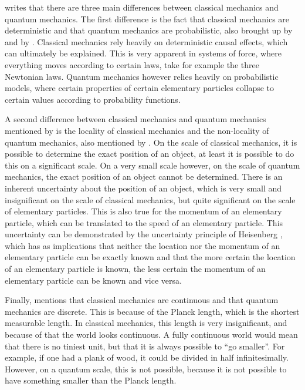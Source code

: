 \documentclass[11pt,twoside]{report} %
\begin{document}
 writes that there are three main differences between classical mechanics and quantum mechanics. The first difference is the fact that classical mechanics are deterministic and that quantum mechanics are probabilistic, also brought up by  and by . Classical mechanics rely heavily on deterministic causal effects, which can ultimately be explained. This is very apparent in systems of force, where everything moves according to certain laws, take for example the three Newtonian laws. Quantum mechanics however relies heavily on probabilistic models, where certain properties of certain elementary particles collapse to certain values according to probability functions.

A second difference between classical mechanics and quantum mechanics mentioned by  is the locality of classical mechanics and the non-locality of quantum mechanics, also mentioned by . On the scale of classical mechanics, it is possible to determine the exact position of an object, at least it is possible to do this on a significant scale. On a very small scale however, on the scale of quantum mechanics, the exact position of an object  cannot be determined. There is an inherent uncertainty about the position of an object, which is very small and insignificant on the scale of classical mechanics, but quite significant on the scale of elementary particles. This is also true for the momentum of an elementary particle, which can be translated to the speed of an elementary particle. This uncertainty can be demonstrated by the uncertainty principle of Heisenberg \cite{henriksen, muller, velentzas}, which has as implications that neither the location nor the momentum of an elementary particle can be exactly known and that the more certain the location of an elementary particle is known, the less certain the momentum of an elementary particle can be known and vice versa.

Finally,  mentions that classical mechanics are continuous and that quantum mechanics are discrete. This is because of the Planck length, which is the shortest measurable length. In classical mechanics, this length is very insignificant, and because of that the world looks continuous. A fully continuous world would mean that there is no tiniest unit, but that it is always possible to “go smaller”. For example, if one had a plank of wood, it could be divided in half infinitesimally. However, on a quantum scale, this is not possible, because it is not possible to have something smaller than the Planck length.
\end{document}

